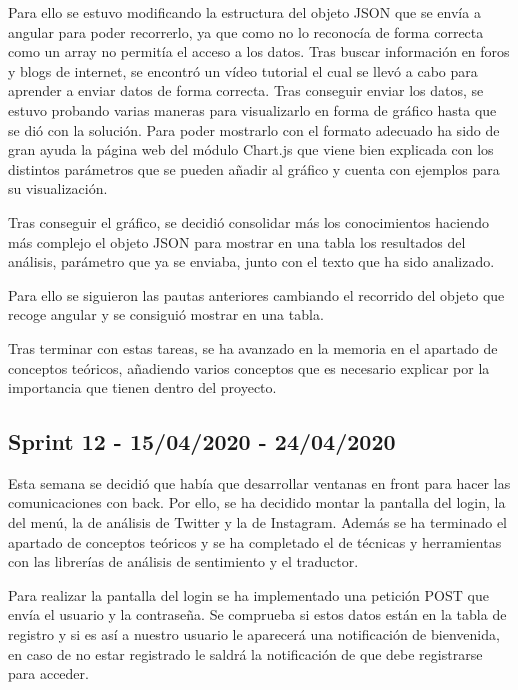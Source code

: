 Para ello se estuvo modificando la estructura del objeto JSON que se envía a angular para poder recorrerlo, ya que como no lo reconocía de forma correcta como un array no permitía el acceso a los datos. Tras buscar información en foros y blogs de internet, se encontró un vídeo tutorial el cual se llevó a cabo para aprender a enviar datos de forma correcta.
Tras conseguir enviar los datos, se estuvo probando varias maneras para visualizarlo en forma de gráfico hasta que se dió con la solución. Para poder mostrarlo con el formato adecuado ha sido de gran ayuda la página web del módulo Chart.js que viene bien explicada con los distintos parámetros que se pueden añadir al gráfico y cuenta con ejemplos para su visualización.

Tras conseguir el gráfico, se decidió consolidar más los conocimientos haciendo más complejo el objeto JSON para mostrar en una tabla los resultados del análisis, parámetro que ya se enviaba, junto con el texto que ha sido analizado.

Para ello se siguieron las pautas anteriores cambiando el recorrido del objeto que recoge angular y se consiguió mostrar en una tabla.

Tras terminar con estas tareas, se ha avanzado en la memoria en el apartado de conceptos teóricos, añadiendo varios conceptos que es necesario explicar por la importancia que tienen dentro del proyecto.


\subsection{Sprint 12 - 15/04/2020 - 24/04/2020}
Esta semana se decidió que había que desarrollar ventanas en front para hacer las comunicaciones con back.
Por ello, se ha decidido montar la pantalla del login, la del menú, la de análisis de Twitter y la de Instagram. Además se ha terminado el apartado de conceptos teóricos y se ha completado el de técnicas y herramientas con las librerías de análisis de sentimiento y el traductor.

Para realizar la pantalla del login se ha implementado una petición POST que envía el usuario y la contraseña. Se comprueba si estos datos están en la tabla de registro y si es así a nuestro usuario le aparecerá una notificación de bienvenida, en caso de no estar registrado le saldrá la notificación de que debe registrarse para acceder.

